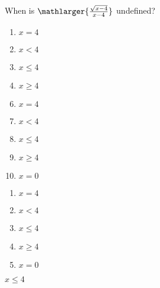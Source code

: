 



  When is $\mathlarger{\frac{\sqrt{x-4}}{x-4}}$ undefined?\\


\ifsat
	\begin{enumerate}[label=\Alph*)]
		\item   $x = 4$
		\item  $x < 4$
		\item   $x \leq 4$%
		\item  $x \geq 4$
	\end{enumerate}
\else
\fi

\ifacteven
	\begin{enumerate}[label=\textbf{\Alph*.},itemsep=\fill,align=left]
		\setcounter{enumii}{5}
		\item   $x = 4$
		\item  $x < 4$
		\item   $x \leq 4$%
		\addtocounter{enumii}{1}
		\item  $x \geq 4$
		\item  $x = 0$
	\end{enumerate}
\else
\fi

\ifactodd
	\begin{enumerate}[label=\textbf{\Alph*.},itemsep=\fill,align=left]
		\item   $x = 4$
		\item  $x < 4$
		\item   $x \leq 4$%
		\item  $x \geq 4$
		\item  $x = 0$
	\end{enumerate}
\else
\fi

\ifgridin
   $x \leq 4$%
		
\else
\fi

